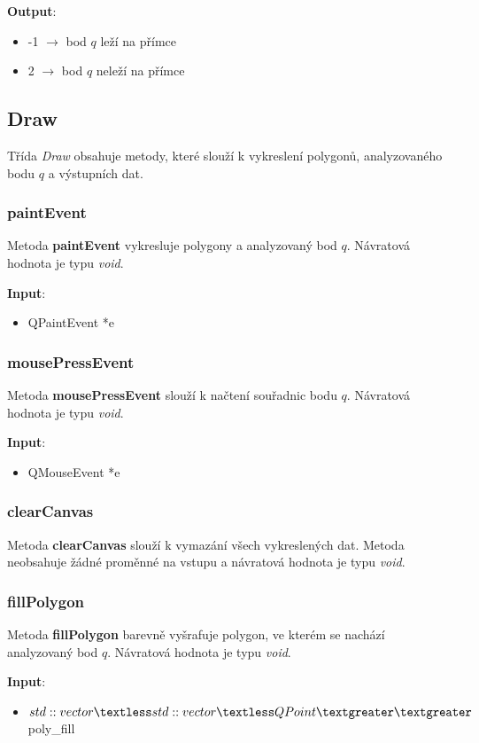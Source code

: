 \documentclass[a4paper, 12pt]{article}
\begin{document}
\textbf{Output}:
\begin{itemize}
\item -1 $\rightarrow$ bod $q$ leží na přímce
\item 2 $\rightarrow$ bod $q$ neleží na přímce
\end{itemize}

\subsection{Draw}
Třída \textsl{Draw} obsahuje metody, které slouží k vykreslení polygonů, analyzovaného bodu $q$ a výstupních dat.

\subsubsection{paintEvent}
Metoda \textbf{paintEvent} vykresluje polygony a analyzovaný bod $q$. Návratová hodnota je typu \textsl{void}.

\textbf{Input}:
\begin{itemize}
\item QPaintEvent *e
\end{itemize}

\subsubsection{mousePressEvent}
Metoda \textbf{mousePressEvent} slouží k načtení souřadnic bodu $q$. Návratová hodnota je typu \textsl{void}.

\textbf{Input}:
\begin{itemize}
\item QMouseEvent *e
\end{itemize}

\subsubsection{clearCanvas}
Metoda \textbf{clearCanvas} slouží k vymazání všech vykreslených dat. Metoda neobsahuje žádné proměnné na vstupu a návratová hodnota je typu \textsl{void}.

\subsubsection{fillPolygon}
Metoda \textbf{fillPolygon} barevně vyšrafuje polygon, ve kterém se nachází analyzovaný bod $q$. Návratová hodnota je typu \textsl{void}.

\textbf{Input}:
\begin{itemize}
\item $std::vector\textless std::vector\textless QPoint\textgreater \textgreater$ poly\_fill
\end{itemize}
\end{document}
